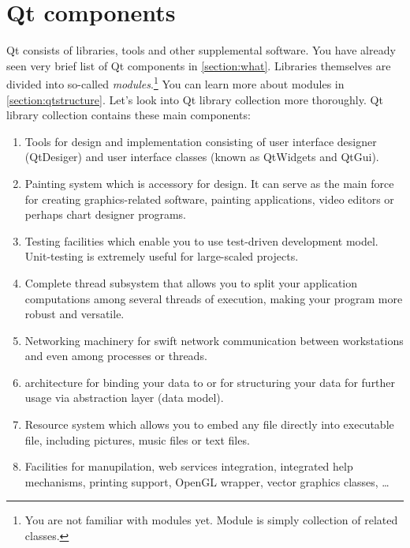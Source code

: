 \section{Qt components}\label{section:components}
Qt consists of libraries, tools and other supplemental software. You have already seen very brief list of Qt components in \autoref{section:what}. Libraries themselves are divided into so-called \textit{modules}.\footnote{You are not familiar with modules yet. Module is simply collection of related classes.} You can learn more about modules in \autoref{section:qtstructure}. Let's look into Qt library collection more thoroughly. Qt library collection contains these main components:

\begin{enumerate}
\item Tools for  design and implementation consisting of user interface designer (QtDesiger) and user interface classes (known as QtWidgets and QtGui).
\item Painting system which is accessory for  design. It can serve as the main force for creating graphics-related software, \eg painting applications, video editors or perhaps chart designer programs.
\item Testing facilities which enable you to use test-driven development model. Unit-testing is extremely useful for large-scaled projects.
\item Complete thread subsystem that allows you to split your application computations among several threads of execution, making your program more robust and versatile.
\item Networking machinery for swift network communication between workstations and even among processes or threads.
\item {} architecture for binding your data to  or for structuring your data for further usage via abstraction layer (data model).
\item Resource system which allows you to embed any file directly into executable file, including pictures, music files or text files.
\item Facilities for  manupilation, web services integration, integrated help mechanisms, printing support, OpenGL wrapper, vector graphics classes, \ldots
\end{enumerate}

